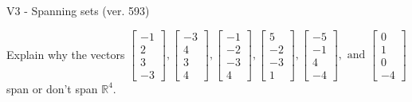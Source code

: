 \begin{exercise}
  \begin{exerciseTitle}V3 - Spanning sets (ver. 593)\end{exerciseTitle}
  \begin{exerciseStatement}
    Explain why the vectors \(\left[\begin{array}{r}
-1 \\
2 \\
3 \\
-3
\end{array}\right] , \left[\begin{array}{r}
-3 \\
4 \\
3 \\
4
\end{array}\right] , \left[\begin{array}{r}
-1 \\
-2 \\
-3 \\
4
\end{array}\right] , \left[\begin{array}{r}
5 \\
-2 \\
-3 \\
1
\end{array}\right] , \left[\begin{array}{r}
-5 \\
-1 \\
4 \\
-4
\end{array}\right] , \text{ and } \left[\begin{array}{r}
0 \\
1 \\
0 \\
-4
\end{array}\right]\) span or don't span \(\mathbb{R}^4\). 
	



\end{exerciseStatement}
\end{exercise}
